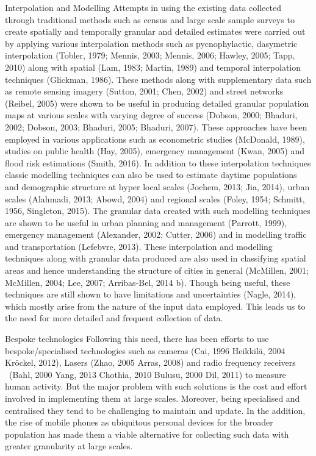 Interpolation and Modelling Attempts in using the existing data collected
through traditional methods such as census and large scale sample surveys to
create spatially and temporally granular and detailed estimates were carried out
by applying various interpolation methods such as pycnophylactic, dasymetric
interpolation (Tobler, 1979; Mennis, 2003; Mennis, 2006; Hawley, 2005; Tapp,
2010) along with spatial (Lam, 1983; Martin, 1989) and temporal interpolation
techniques (Glickman, 1986). These methods along with supplementary data such as
remote sensing imagery (Sutton, 2001; Chen, 2002) and street networks (Reibel,
2005) were shown to be useful in producing detailed granular population maps at
various scales with varying degree of success (Dobson, 2000; Bhaduri, 2002;
Dobson, 2003; Bhaduri, 2005; Bhaduri, 2007). These approaches have been employed
in various applications such as econometric studies (McDonald, 1989), studies on
public health (Hay, 2005), emergency management (Kwan, 2005) and flood risk
estimations (Smith, 2016). In addition to these interpolation techniques classic
modelling techniques can also be used to estimate daytime populations and
demographic structure at hyper local scales (Jochem, 2013; Jia, 2014), urban
scales (Alahmadi, 2013; Abowd, 2004) and regional scales (Foley, 1954; Schmitt,
1956, Singleton, 2015). The granular data created with such modelling techniques
are shown to be useful in urban planning and management (Parrott, 1999),
emergency management (Alexander, 2002; Cutter, 2006) and in modelling traffic
and transportation (Lefebvre, 2013). These interpolation and modelling
techniques along with granular data produced are also used in classifying
spatial areas and hence understanding the structure of cities in general
(McMillen, 2001; McMillen, 2004; Lee, 2007; Arribas-Bel, 2014 b). Though being
useful, these techniques are still shown to have limitations and uncertainties
(Nagle, 2014), which mostly arise from the nature of the input data employed.
This leads us to the need for more detailed and frequent collection of data.


Bespoke technologies Following this need, there has been efforts to use
bespoke/specialised technologies such as cameras (Cai, 1996 Heikkilä, 2004
Kröckel, 2012), Lasers (Zhao, 2005 Arras, 2008) and radio frequency receivers
 (Bahl, 2000 Yang, 2013 Chothia, 2010 Bulusu, 2000 Dil, 2011) to measure human
activity. But the major problem with such solutions is the cost and effort
involved in implementing them at large scales. Moreover, being specialised and
centralised they tend to be challenging to maintain and update. In the addition,
the rise of mobile phones as ubiquitous personal devices for the broader
population has made them a viable alternative for collecting such data with
greater granularity at large scales.


